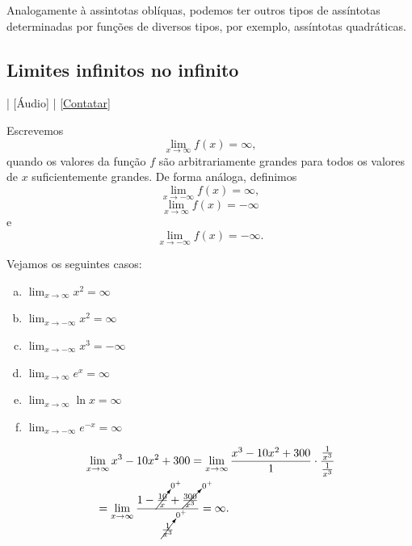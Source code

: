 \begin{obs}
  Analogamente à assintotas oblíquas, podemos ter outros tipos de assíntotas determinadas por funções de diversos tipos, por exemplo, assíntotas quadráticas.
\end{obs}

\subsection{Limites infinitos no infinito}

\begin{flushright}
  [Vídeo] | [Áudio] | \href{https://phkonzen.github.io/notas/contato.html}{[Contatar]}
\end{flushright}

Escrevemos
\begin{equation}
  \lim_{x\to\infty} f(x)=\infty,
\end{equation}
quando os valores da função $f$ são arbitrariamente grandes para todos os valores de $x$ suficientemente grandes. De forma análoga, definimos
\begin{equation}
  \lim_{x\to -\infty} f(x)=\infty,
\end{equation}
\begin{equation}
  \lim_{x\to \infty} f(x)=-\infty
\end{equation}
e
\begin{equation}
  \lim_{x\to -\infty} f(x)=-\infty.
\end{equation}

\begin{ex}
  Vejamos os seguintes casos:
  \begin{enumerate}[a)]
  \item $\displaystyle\lim_{x\to\infty} x^2 = \infty$
  \item $\displaystyle\lim_{x\to -\infty} x^2 = \infty$
  \item $\displaystyle\lim_{x\to -\infty} x^3 = -\infty$
  \item $\displaystyle\lim_{x\to \infty} e^x = \infty$
  \item $\displaystyle\lim_{x\to \infty} \ln x = \infty$
  \item $\displaystyle\lim_{x\to -\infty} e^{-x} = \infty$
  \end{enumerate}
\end{ex}

\begin{ex}\label{ex:liminf_poli}
  \begin{align}
    & \lim_{x\to \infty} x^3 - 10x^2 + 300 = \lim_{x\to \infty} \frac{x^3 - 10x^2 + 300}{1}\cdot\frac{\frac{1}{x^3}}{\frac{1}{x^3}} \\
    & \text{}\quad = \lim_{x\to \infty} \frac{1 - \cancelto{0^+}{\frac{10}{x}} + \cancelto{0^+}{\frac{300}{x^3}}}{\cancelto{0^+}{\frac{1}{x^3}}} = \infty.                                   
  \end{align}
\end{ex}

